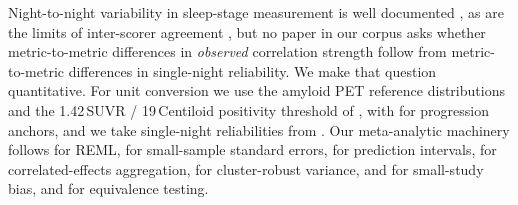  Night-to-night variability in sleep-stage measurement
is well documented \citep{levendowski2017}, as are the limits of inter-scorer agreement
\citep{nikkonen2024}, but no paper in our corpus asks whether metric-to-metric differences in
\emph{observed} correlation strength follow from metric-to-metric differences in single-night
reliability. We make that question quantitative. For unit conversion we use the amyloid PET
reference distributions and the 1.42\,SUVR / 19\,Centiloid positivity threshold of
\citet{jack2017}, with \citet{hanseeuw2021} for progression anchors, and we take single-night
reliabilities from \sleepedf \citep{kemp2000}. Our meta-analytic machinery follows
\citet{viechtbauer2005} for REML, \citet{knapp2003} for small-sample standard errors,
\citet{higgins2009} for prediction intervals, \citet{borenstein2009} for correlated-effects
aggregation, \citet{hedges2010} for cluster-robust variance, \citet{egger1997} and
\citet{duval2000} for small-study bias, and \citet{lakens2017} for equivalence testing.
